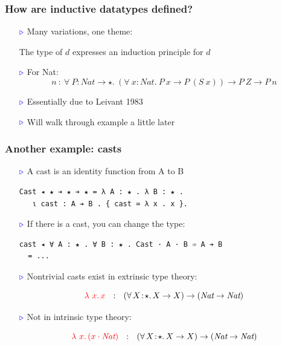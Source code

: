 \documentclass[11pt]{beamer}
\newcommand{\abs}[4]{{#1}\, #2\! : \! #3.\, #4}
\newcommand{\myb}[0]{\ensuremath{\textcolor{blue}{\triangleright}}}
\begin{document}
\begin{frame}
  \frametitle{How are inductive datatypes defined?}

  \begin{itemize}
  \item[$\myb$] Many variations, one theme:

    \vspace{.2cm}
    
{\color{blue}
    The type of $d$ expresses an induction principle for $d$ 
}

    \vspace{.2cm}


  \item[$\myb$] For Nat:
    \[
    n\ :\ \forall\ P : \textit{Nat} \to \star.\ (\forall\ x:\textit{Nat}.\ P\ x \to P\ (S\ x)) \to P\ Z \to P\ n
    \]
    
  \item[$\myb$] Essentially due to Leivant 1983
  \item[$\myb$] Will walk through example a little later
  \end{itemize}
\end{frame}

\begin{frame}[containsverbatim]
  \frametitle{Another example: casts}

  \begin{itemize}
  \item[$\myb$] A cast is an identity function from A to B

{\small
\begin{verbatim}
Cast ◂ ★ ➔ ★ ➔ ★ = λ A : ★ . λ B : ★ .
   ι cast : A ➔ B . { cast ≃ λ x . x }.
\end{verbatim}
}

\item[$\myb$] If there is a cast, you can change the type:

{\small
\begin{verbatim}
cast ◂ ∀ A : ★ . ∀ B : ★ . Cast · A · B ➾ A ➔ B 
  = ...
\end{verbatim}
}

\item[$\myb$] Nontrivial casts exist in extrinsic type theory:

\vspace{-.2cm}

\[ {\color{red}\lambda\ x.\,x} \ \ : \ \ (\abs{\forall}{X}{\star}{X\to X}) \to (\textit{Nat} \to \textit{Nat}) \]

\item[$\myb$] Not in intrinsic type theory:

\vspace{-.2cm}

\[ {\color{red}\lambda\ x.\,(x \cdot \textit{Nat})} \ \ : \ \ (\abs{\forall}{X}{\star}{X\to X}) \to (\textit{Nat} \to \textit{Nat}) \]

  \end{itemize}

  \end{frame}
\end{document}
